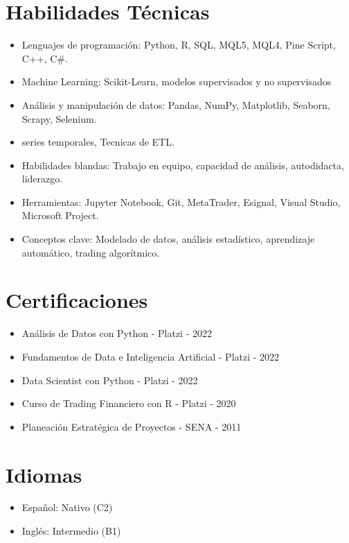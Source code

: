 \documentclass[letterpaper,12pt]{article}
\begin{document}
\section*{Habilidades Técnicas}
\begin{itemize}
    \item Lenguajes de programación: Python, R, SQL, MQL5, MQL4, Pine Script, C++, C$\#$.
    \item Machine Learning: Scikit-Learn, modelos supervisados y no supervisados
    \item Análisis y manipulación de datos: Pandas, NumPy, Matplotlib, Seaborn, Scrapy, Selenium.
    \item series temporales, Tecnicas de ETL.
    \item Habilidades blandas: Trabajo en equipo, capacidad de análisis, autodidacta, liderazgo.
    \item Herramientas: Jupyter Notebook, Git, MetaTrader, Esignal, Visual Studio, Microsoft Project.
    \item Conceptos clave: Modelado de datos, análisis estadístico, aprendizaje automático, trading algorítmico.
\end{itemize}

\section*{Certificaciones}

\begin{itemize}
    \item Análisis de Datos con Python - Platzi - 2022
    \item Fundamentos de Data e Inteligencia Artificial - Platzi - 2022
    \item Data Scientist con Python - Platzi - 2022
    \item Curso de Trading Financiero con R - Platzi - 2020
    \item Planeación Estratégica de Proyectos - SENA - 2011
\end{itemize}

\section*{Idiomas}

\begin{itemize}
    \item Español: Nativo (C2)
    \item Inglés: Intermedio (B1)
\end{itemize}
\end{document}
